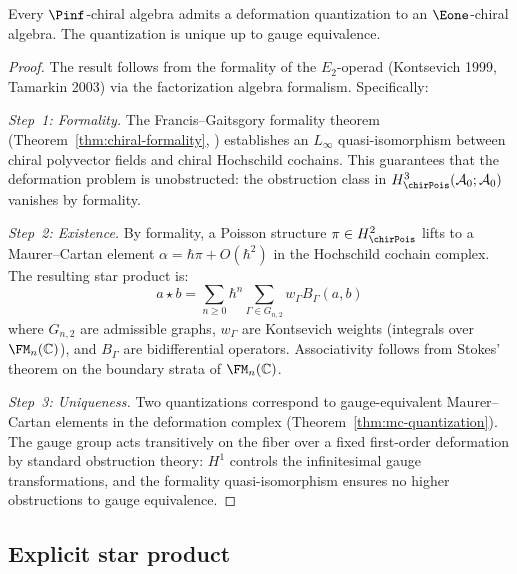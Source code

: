 \begin{theorem}\label{thm:pinf-formality}
Every $\Pinf$-chiral algebra admits a deformation quantization to an $\Eone$-chiral
algebra. The quantization is unique up to gauge equivalence.
\end{theorem}

\begin{proof}
The result follows from the formality of the $E_2$-operad (Kontsevich 1999,
Tamarkin 2003) via the factorization algebra formalism.  Specifically:

\emph{Step~1: Formality.}
The Francis--Gaitsgory formality theorem
(Theorem~\ref{thm:chiral-formality}, \ClaimStatusProvedElsewhere{} \cite{FG12})
establishes an $L_\infty$ quasi-isomorphism between chiral polyvector
fields and chiral Hochschild cochains.  This guarantees that the
deformation problem is unobstructed: the obstruction class in
$H^3_{\chirPois}(\mathcal{A}_0; \mathcal{A}_0)$ vanishes by formality.

\emph{Step~2: Existence.}
By formality, a Poisson structure $\pi \in H^2_{\chirPois}$ lifts to a
Maurer--Cartan element $\alpha = \hbar\pi + O(\hbar^2)$ in the
Hochschild cochain complex.  The resulting star product is:
\[
a \star b = \sum_{n \geq 0} \hbar^n \sum_{\Gamma \in G_{n,2}} w_\Gamma B_\Gamma(a, b)
\]
where $G_{n,2}$ are admissible graphs, $w_\Gamma$ are Kontsevich weights
(integrals over $\FM_n(\mathbb{C})$), and $B_\Gamma$ are bidifferential
operators.  Associativity follows from Stokes' theorem on the boundary
strata of $\FM_n(\mathbb{C})$.

\emph{Step~3: Uniqueness.}
Two quantizations correspond to gauge-equivalent Maurer--Cartan elements
in the deformation complex (Theorem~\ref{thm:mc-quantization}).  The
gauge group acts transitively on the fiber over a fixed first-order
deformation by standard obstruction theory: $H^1$ controls the
infinitesimal gauge transformations, and the formality quasi-isomorphism
ensures no higher obstructions to gauge equivalence.
\end{proof}


\subsection{Explicit star product}

